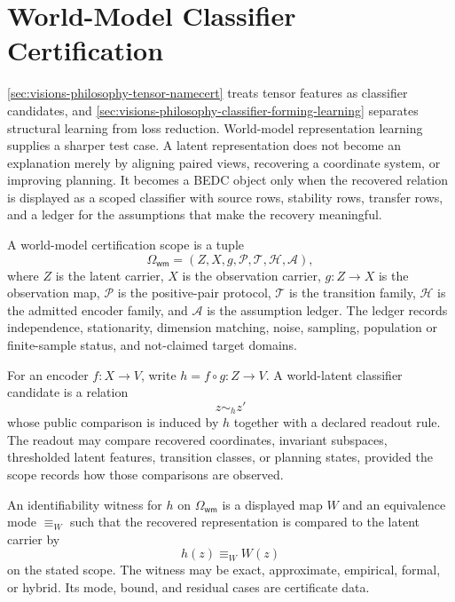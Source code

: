 \section{World-Model Classifier Certification}
\label{sec:visions-philosophy-world-model-classifier-certification}

\autoref{sec:visions-philosophy-tensor-namecert} treats tensor features
as classifier candidates, and
\autoref{sec:visions-philosophy-classifier-forming-learning} separates
structural learning from loss reduction. World-model representation
learning supplies a sharper test case. A latent representation does not
become an explanation merely by aligning paired views, recovering a
coordinate system, or improving planning. It becomes a BEDC object only
when the recovered relation is displayed as a scoped classifier with
source rows, stability rows, transfer rows, and a ledger for the
assumptions that make the recovery meaningful.

\begin{definition}
\label{def:philosophy-world-model-certification-scope}
A world-model certification scope is a tuple
$$
\Omega_{\mathsf{wm}}
=
(Z,X,g,\mathcal P,\mathcal T,\mathcal H,\mathcal A),
$$
where $Z$ is the latent carrier, $X$ is the observation carrier,
$g:Z\to X$ is the observation map, $\mathcal P$ is the positive-pair
protocol, $\mathcal T$ is the transition family, $\mathcal H$ is the
admitted encoder family, and $\mathcal A$ is the assumption ledger. The
ledger records independence, stationarity, dimension matching, noise,
sampling, population or finite-sample status, and not-claimed target
domains.
\end{definition}

\begin{definition}
\label{def:philosophy-world-latent-classifier-candidate}
For an encoder $f:X\to V$, write $h=f\circ g:Z\to V$. A world-latent
classifier candidate is a relation
$$
z\sim_h z'
$$
whose public comparison is induced by $h$ together with a declared
readout rule. The readout may compare recovered coordinates, invariant
subspaces, thresholded latent features, transition classes, or planning
states, provided the scope records how those comparisons are observed.
\end{definition}

\begin{definition}
\label{def:philosophy-identifiability-witness}
An identifiability witness for $h$ on $\Omega_{\mathsf{wm}}$ is a
displayed map $W$ and an equivalence mode $\equiv_W$ such that the
recovered representation is compared to the latent carrier by
$$
h(z)\equiv_W W(z)
$$
on the stated scope. The witness may be exact, approximate, empirical,
formal, or hybrid. Its mode, bound, and residual cases are certificate
data.
\end{definition}


